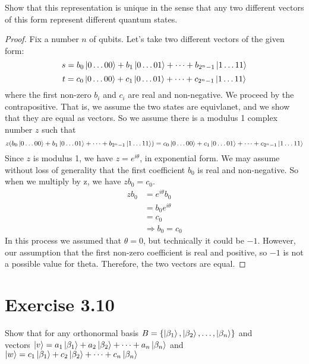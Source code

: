 \documentclass[11pt]{article}
\begin{document}
Show that this representation is unique in the sense that any two different vectors
of this form represent different quantum states. 
\begin{proof}
    Fix a number $n$ of qubits. Let's take two different vectors of the given form:
$$s = b_{0}\ket{0\dots00} + b_{1}\ket{0\dots01} + \cdots + b_{2^{n}-1}\ket{1\dots11}$$
$$t = c_{0}\ket{0\dots00} + c_{1}\ket{0\dots01} + \cdots + c_{2^{n}-1}\ket{1\dots11}$$
where the first non-zero $b_i$ and $c_i$ are real and non-negative.
We proceed by the contrapositive. That is, we assume the two states are equivlanet, and we show that they are equal as vectors.
So we assume there is a modulus 1 complex number $z$ such that 
    $$z(b_{0}\ket{0\dots00} + b_{1}\ket{0\dots01} + \cdots + b_{2^{n}-1}\ket{1\dots11})
    = c_{0}\ket{0\dots00} + c_{1}\ket{0\dots01} + \cdots + c_{2^{n}-1}\ket{1\dots11} $$
    Since $z$ is modulus 1, we have $z = e^{i\theta}$, in exponential form. 
    We may assume without loss of generality that the first coefficient $b_0$ is real and non-negative. 
    So when we multiply by z, we have $zb_0 = c_0$.
    \begin{align*}
        zb_0 &= e^{i\theta}b_0 \\
        &= b_0e^{i\theta} \\
        &= c_0 \\
        &\Rightarrow b_0 = c_0
    \end{align*}
    In this process we assumed that $\theta = 0$, but technically it could be $-1$. However, our assumption 
    that the first non-zero coefficient is real and positive, so $-1$ is not a possible value for theta.
    Therefore, the two vectors are equal. 
\end{proof}

\section*{Exercise 3.10}

Show that for any orthonormal basis 
$B = \{\ket{\beta_1},\ket{\beta_2},\dots, \ket{\beta_n}\}$ 
and \\ vectors $\ket{v} = a_1\ket{\beta_1} + a_2\ket{\beta_2} + \dots + a_n\ket{\beta_n}$ 
and $\ket{w} = c_1\ket{\beta_1} + c_2\ket{\beta_2} + \dots + c_n\ket{\beta_n}$
\end{document}
